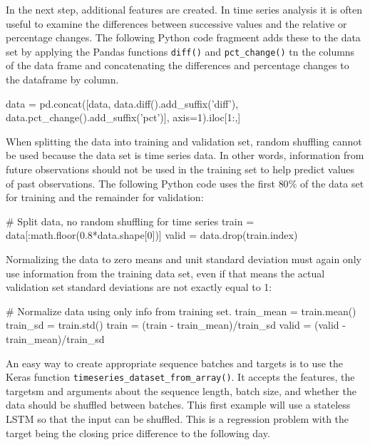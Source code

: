 In the next step, additional features are created. In time series analysis it is often useful to examine the differences between successive values and the relative or percentage changes. The following Python code fragmeent adds these to the data set by applying the Pandas functions \texttt{diff()} and \texttt{pct\_change()} tn the columns of the data frame and concatenating the differences and percentage changes to the dataframe by column.

\begin{samepage}
\begin{pythoncode}
data = pd.concat([data,
    data.diff().add_suffix('diff'),
    data.pct_change().add_suffix('pct')],
    axis=1).iloc[1:,]
\end{pythoncode}
\end{samepage}

When splitting the data into training and validation set, random shuffling cannot be used because the data set is time series data. In other words, information from future observations should not be used in the training set to help predict values of past observations. The following Python code uses the first $80\%$ of the data set for training and the remainder for validation:

\begin{samepage}
\begin{pythoncode}    
# Split data, no random shuffling for time series
train = data[:math.floor(0.8*data.shape[0])]
valid = data.drop(train.index)
\end{pythoncode}
\end{samepage}

Normalizing the data to zero means and unit standard deviation must again only use information from the training data set, even if that means the actual validation set standard deviations are not exactly equal to 1:

\begin{samepage}
\begin{pythoncode}
# Normalize data using only info from training set.
train_mean = train.mean()
train_sd = train.std()
train = (train - train_mean)/train_sd
valid = (valid - train_mean)/train_sd
\end{pythoncode}
\end{samepage}

An easy way to create appropriate sequence batches and targets is to use the Keras function \texttt{timeseries\_dataset\_from\_array()}. It accepts the features, the targetsm and arguments about the sequence length, batch size, and whether the data should be shuffled between batches. This first example will use a stateless LSTM so that the input can be shuffled. This is a regression problem with the target being the closing price difference to the following day.

